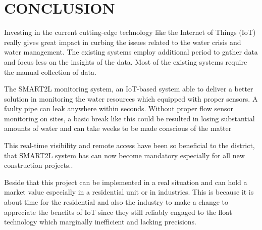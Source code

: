 \documentclass[12pt,times,a4paper]{report}
\begin{document}
{{\begin{normalsize}
\begin{figure}
\begin{center}
\caption{}
\end{center}
\end{figure}
\pagebreak

\chapter{\fontsize{16}{14}\textbf{CONCLUSION}}

\par
Investing in the current cutting-edge technology like the Internet of Things (IoT) really gives great impact in curbing the issues related to the water crisis and water management. The existing systems employ additional period to gather data and focus less on the insights of the data. Most of the existing systems require the manual collection of data. 
\par
The SMART2L monitoring system, an IoT-based system able to deliver a better solution in monitoring the water resources which equipped with proper sensors. A faulty pipe can leak anywhere within seconds. Without proper flow sensor monitoring on sites, a basic break like this could be resulted in losing substantial amounts of water and can take weeks to be made conscious of the matter
\par
  This real-time visibility and remote access have been so beneficial to the district, that SMART2L system has can now become mandatory especially for all new construction projects.. 
\par
Beside that this project can be implemented in a real situation and can hold a market value especially in a residential unit or in industries. This is because it is about time for the residential and also the industry to make a change to appreciate the benefits of IoT since they still reliably engaged to the float technology which marginally inefficient and lacking precisions.


\end{normalsize}}}
\end{document}
